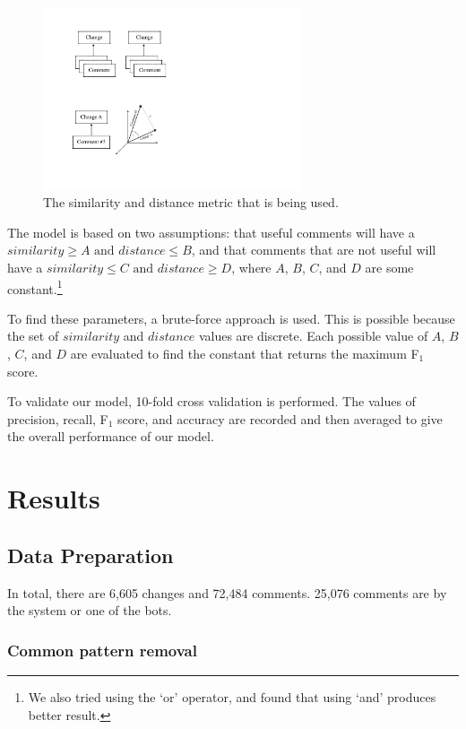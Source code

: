 \documentclass[conference]{IEEEtran}
\begin{document}
\begin{figure}[h]
\centering
\includegraphics[width=3in]{vector}
\caption{The similarity and distance metric that is being used.}
\label{fig:vector}
\end{figure}

The model is based on two assumptions: that useful comments will have a $similarity \geq A \text{ and } distance \leq B$,
and that comments that are not useful will have a $ similarity \leq C \text{ and } distance \geq D$,
where $A$, $B$, $C$, and $D$ are some constant.\footnote{We also tried using the `or' operator, and found that using `and' produces better result.}

To find these parameters, a brute-force approach is used.
This is possible because the set of $similarity$ and $distance$ values are discrete.
Each possible value of $A$, $B$, $C$, and $D$ are evaluated to find the constant that returns the maximum F$_1$ score.

To validate our model, 10-fold cross validation is performed.
The values of precision, recall, F$_1$ score, and accuracy are recorded and then averaged
to give the overall performance of our model.


\section{Results}

\subsection{Data Preparation}

In total, there are 6,605 changes and 72,484 comments. 25,076 comments are by the system or one of the bots.

\subsubsection{Common pattern removal}
\end{document}
